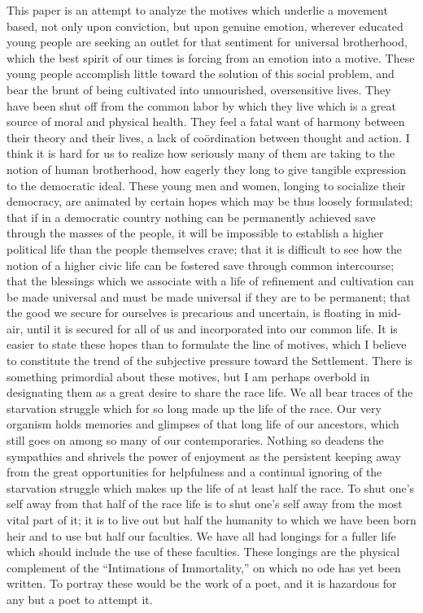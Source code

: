This paper is an attempt to analyze the motives which underlie a
movement based, not only upon conviction, but upon genuine emotion,
wherever educated young people are seeking an outlet for that
sentiment for universal brotherhood, which the best spirit of our
times is forcing from an emotion into a motive. These young people
accomplish little toward the solution of this social problem, and bear
the brunt of being cultivated into unnourished, oversensitive lives.
They have been shut off from the common labor by which they live which
is a great source of moral and physical health. They feel a fatal want
of harmony between their theory and their lives, a lack of
co\"{o}rdination between thought and action. I think it is hard for us
to realize how seriously many of  them are taking to the
notion of human brotherhood, how eagerly they long to give tangible
expression to the democratic ideal. These young men and women, longing
to socialize their democracy, are animated by certain hopes which may
be thus loosely formulated; that if in a democratic country nothing
can be permanently achieved save through the masses of the people, it
will be impossible to establish a higher political life than the
people themselves crave; that it is difficult to see how the notion of
a higher civic life can be fostered save through common intercourse;
that the blessings which we associate with a life of refinement and
cultivation can be made universal and must be made universal if they
are to be permanent; that the good we secure for ourselves is
precarious and uncertain, is floating in mid-air, until it is secured
for all of us and incorporated into our common life. It is easier to
state these hopes than to formulate the line of motives, which I
believe to constitute the trend of the subjective pressure toward the
Settlement. There is something primordial about these motives, but I
am perhaps overbold in designating them as a great desire to share the
race life. We all bear traces of the starvation struggle which for so
long made up the life of the race. Our very organism holds memories
and glimpses of that long life of our ancestors, which still goes on
among so many of our contemporaries. Nothing so deadens the sympathies
and shrivels the power of enjoyment as the persistent keeping away
from the great opportunities for helpfulness and a continual ignoring
of the starvation struggle which makes up the life of at least half
the race. To shut one's self away from that  half of the
race life is to shut one's self away from the most vital part of it;
it is to live out but half the humanity to which we have been born
heir and to use but half our faculties. We have all had longings for a
fuller life which should include the use of these faculties. These
longings are the physical complement of the ``Intimations of
Immortality,'' on which no ode has yet been written. To portray these
would be the work of a poet, and it is hazardous for any but a poet to
attempt it.

